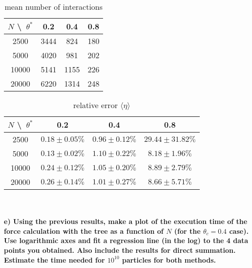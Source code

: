     \begin{table}[h!]
        \begin{center}
        \caption{mean number of interactions}
        \begin{tabular}{c | c | c | c}
            $N$ \textbackslash\ $\theta^*$ & 0.2  & 0.4  & 0.8 \\
            \hline
            2500   & 3444 & 824  & 180 \\
            \hline
            5000   & 4020 & 981  & 202 \\
            \hline
            10000  & 5141 & 1155 & 226 \\
            \hline
            20000  & 6220 & 1314 & 248 \\
        \end{tabular}
        \end{center}
    \end{table} 
    \begin{table}[h!]
        \begin{center}
            \caption{relative error $\langle\eta\rangle$}
            \begin{tabular}{c | c | c | c}
                $N$ \textbackslash\ $\theta^*$ & 0.2 & 0.4 & 0.8 \\
                \hline
                2500   & $0.18\pm0.05\%$ & $0.96\pm0.12\%$ & $29.44\pm31.82\%$ \\
                \hline
                5000   & $0.13\pm0.02\%$ & $1.10\pm0.22\%$ & $8.18\pm1.96\%$ \\
                \hline
                10000  & $0.24\pm0.12\%$ & $1.05\pm0.20\%$ & $8.89\pm2.79\%$ \\
                \hline
                20000  & $0.26\pm0.14\%$ & $1.01\pm0.27\%$ & $8.66\pm5.71\%$ \\
            \end{tabular}
        \end{center}
    \end{table} \ \\ 

\newpage
\paragraph{e)
    Using the previous results, make a plot of the execution 
    time of the force calculation with the tree as a function of 
    $N$ (for the $\theta_c=0.4$ case). Use logarithmic axes and 
    fit a regression line (in the log) to the 4 data points you 
    obtained. Also include the results for direct summation. 
    Estimate the time needed for $10^{10}$ particles for both 
    methods.
}
